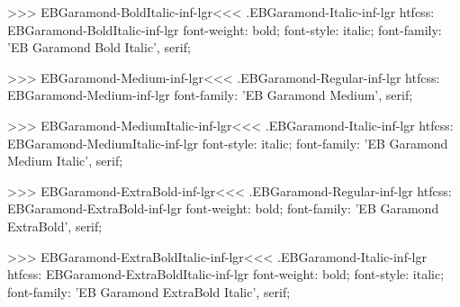>>>
\<EBGaramond-BoldItalic-inf-lgr\><<<
.EBGaramond-Italic-inf-lgr
htfcss:  EBGaramond-BoldItalic-inf-lgr  font-weight: bold; font-style: italic; font-family: 'EB Garamond Bold Italic', serif;

>>>
\<EBGaramond-Medium-inf-lgr\><<<
.EBGaramond-Regular-inf-lgr
htfcss:  EBGaramond-Medium-inf-lgr  font-family: 'EB Garamond Medium', serif;

>>>
\<EBGaramond-MediumItalic-inf-lgr\><<<
.EBGaramond-Italic-inf-lgr
htfcss:  EBGaramond-MediumItalic-inf-lgr  font-style: italic; font-family: 'EB Garamond Medium Italic', serif;

>>>
\<EBGaramond-ExtraBold-inf-lgr\><<<
.EBGaramond-Regular-inf-lgr
htfcss:  EBGaramond-ExtraBold-inf-lgr  font-weight: bold; font-family: 'EB Garamond ExtraBold', serif;

>>>
\<EBGaramond-ExtraBoldItalic-inf-lgr\><<<
.EBGaramond-Italic-inf-lgr
htfcss:  EBGaramond-ExtraBoldItalic-inf-lgr  font-weight: bold; font-style: italic; font-family: 'EB Garamond ExtraBold Italic', serif;

